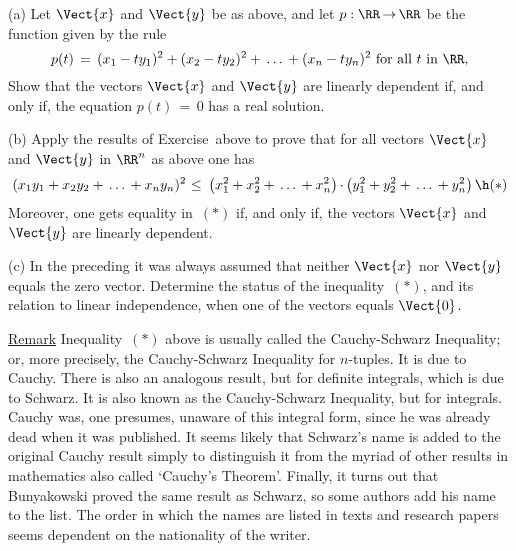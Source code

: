 \V

        (a) Let $\Vect{x}$ and $\Vect{y}$ be as above, and let $p:{\RR} \,{\rightarrow}\, {\RR}$ be the function given by the rule
        \begin{displaymath}
        p(t) \,=\, (x_{1}-ty_{1})^{2} + (x_{2}-ty_{2})^{2} + \,{\ldots}\, + (x_{n}-ty_{n})^{2} \mbox{ for all $t$ in ${\RR}$},
        \end{displaymath}
     Show that the vectors $\Vect{x}$ and $\Vect{y}$ are linearly dependent if, and only if, the equation $p(t) \,=\, 0$ has a real solution.

\V

        (b) Apply the results of Exercise~\ExBt above to prove that for all vectors $\Vect{x}$ and $\Vect{y}$ in ${\RR}^{n}$ as above one has
        \begin{displaymath}
        (x_{1}y_{1} + x_{2}y_{2} + \,{\ldots}\, + x_{n}y_{n})^{2}\,\,{\leq}\,\,\left(x_{1}^{2} + x_{2}^{2} + \,{\ldots}\,+x_{n}^{2}\right){\cdot}\left(y_{1}^{2} + y_{2}^{2} + \,{\ldots}\,+ y_{n}^{2}\right) \h ({\ast})
        \end{displaymath}
    Moreover, one gets equality in~$({\ast})$ if, and only if, the vectors $\Vect{x}$ and $\Vect{y}$ are linearly dependent.

\V

        (c) In the preceding it was always assumed that neither $\Vect{x}$ nor $\Vect{y}$ equals the zero vector.
    Determine the status of the inequality~$({\ast})$, and its relation to linear independence, when one of the vectors equals $\Vect{0}$.

\V

        \underline{Remark} Inequality~$({\ast})$ above is usually called the Cauchy-Schwarz Inequality;
    or, more precisely, the Cauchy-Schwarz Inequality for $n$-tuples. It is due to Cauchy.
    There is also an analogous result, but for definite integrals, which is due to Schwarz.
    It is also known as the Cauchy-Schwarz Inequality, but for integrals. Cauchy was,
    one presumes, unaware of this integral form, since he was already dead when it was published.
    It seems likely that Schwarz's name is added to the original Cauchy result simply to distinguish it from the myriad of other results in mathematics also called `Cauchy's Theorem'.
    Finally, it turns out that Bunyakowski proved the same result as Schwarz, so some authors add his name to the list.
    The order in which the names are listed in texts and research papers seems dependent on the nationality of the writer.

